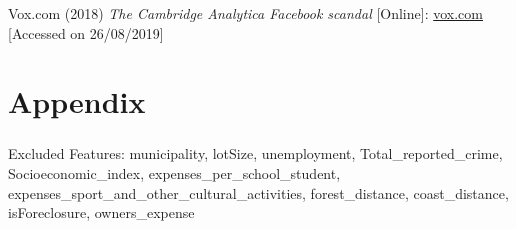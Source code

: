 \documentclass[12pt,a4paper]{article}
\begin{document}
Vox.com (2018) \textit{The Cambridge Analytica Facebook scandal} [Online]: \href{https://www.vox.com/2018/4/10/17207394/cambridge-analytica-facebook-zuckerberg-trump-privacy-scandal}{vox.com} [Accessed on 26/08/2019] 

\newpage
\section{Appendix}
\subsubsection{}
Excluded Features:\newline
municipality, lotSize, unemployment, Total\_reported\_crime, Socioeconomic\_index, expenses\_per\_school\_student, expenses\_sport\_and\_other\_cultural\_activities, forest\_distance, coast\_distance, isForeclosure, owners\_expense
\end{document}
